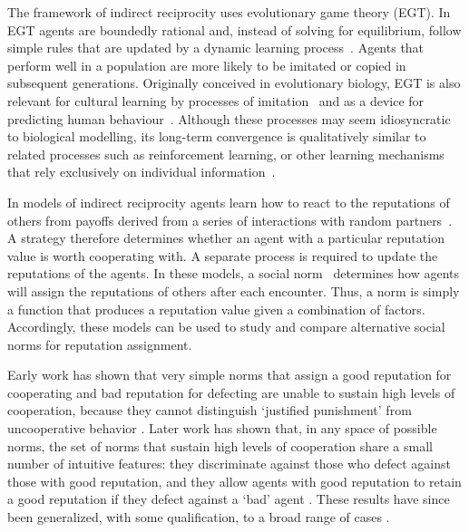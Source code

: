 \documentclass[sigconf]{aamas}  %
\begin{document}
The framework of indirect reciprocity uses evolutionary game theory (EGT). In EGT agents are boundedly rational and, instead of solving for equilibrium, follow simple rules that are updated by a dynamic learning process~\cite{sigmund:book:2010}. Agents that perform well in a population are more likely to be imitated or copied in subsequent generations. Originally conceived in evolutionary biology, EGT is also relevant for cultural learning by processes of imitation~\cite{mcelreath:book:2008} and as a device for predicting human behaviour~\cite{hoffman2012experimental}. Although these processes may seem idiosyncratic to biological modelling, its long-term convergence is qualitatively similar to related processes such as reinforcement learning, or other learning mechanisms that rely exclusively on individual information~\cite{fudenberg:book:1998b}.

In models of indirect reciprocity agents learn how to react to the reputations of others from payoffs derived from a series of interactions with random partners~\cite{nowak:Nature:2005}. A strategy therefore determines whether an agent with a particular reputation value is worth cooperating with. A separate process is required to update the reputations of the agents. In these models, a social norm~\cite{wooldridge:2009:book} determines how agents will assign the reputations of others after each encounter. Thus, a norm is simply a function that produces a  reputation value given a combination of factors. Accordingly, these models  can be used to study and compare alternative social norms for reputation assignment.  

Early work has shown that very simple norms that assign a good reputation for cooperating and bad reputation for defecting are unable to sustain high levels of cooperation, because they cannot distinguish `justified punishment' from uncooperative behavior \cite{Nowak:1998ce}. Later work has shown that, in any space of possible norms, the set of norms that sustain high levels of cooperation share a small number of intuitive features: they discriminate against those who defect against those with good reputation, and they allow agents with good reputation to retain a good reputation if they defect against a `bad' agent \cite{ohtsuki:JTB:2004a,ohtsuki:JTB:2006a}. These results have since been generalized, with some qualification, to a broad range of cases \cite[e.g.][]{santos_social_2018,pacheco:PlosCB:2006,santos_evolution_2016}.
\end{document}
